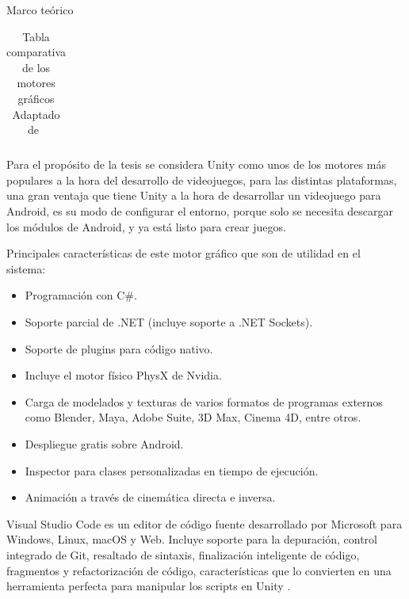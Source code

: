 \begin{thesischapter}{1} {Marco teórico}
\begin{table}[ht]
\begin{tabularx}{\textwidth}{|X|X|X|X|X|X|X|}
        \end{tabularx}
        \label{tab: graphics-engines}
        \caption{ Tabla comparativa de los motores gráficos \\ Adaptado de~\cite{gonjar2019desarrollo}}
    \end{table}
    
    
    \vspace{10pt}
    Para el propósito de la tesis se considera Unity como unos de los motores más populares a la hora del desarrollo de videojuegos, para las distintas plataformas, una gran ventaja que tiene Unity a la hora de desarrollar un videojuego para Android, es su modo de configurar el entorno, porque solo se necesita descargar los módulos de Android, y ya está listo para crear juegos.

    \vspace{5pt}
    Principales características de este motor gráfico que son de utilidad en el sistema:~\cite{unity3d}

    \begin{itemize}
        \item Programación con C\#.
        \item Soporte parcial de .NET (incluye soporte a .NET Sockets).
        \item Soporte de plugins para código nativo.
        \item Incluye el motor físico PhysX de Nvidia.
        \item Carga de modelados y texturas de varios formatos de programas externos como Blender, Maya, Adobe Suite, 3D Max, Cinema 4D, entre otros.
        \item Despliegue gratis sobre Android.
        \item Inspector para clases personalizadas en tiempo de ejecución.
        \item Animación a través de cinemática directa e inversa.
    \end{itemize}

    Visual Studio Code es un editor de código fuente desarrollado por Microsoft para Windows, Linux, macOS y Web. Incluye soporte para la depuración, control integrado de Git, resaltado de sintaxis, finalización inteligente de código, fragmentos y refactorización de código, características que lo convierten en una herramienta perfecta para manipular los scripts en Unity \cite{vscode}.


\end{thesischapter}
